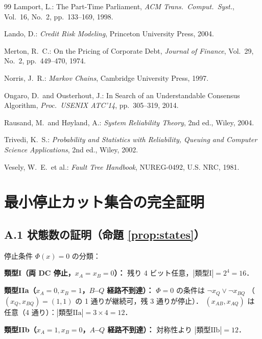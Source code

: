 \documentclass[12pt,a4paper]{article}
\theoremstyle{plain}
\theoremstyle{definition}
\theoremstyle{remark}
\begin{document}
\begin{thebibliography}{99}
  Lamport, L.:
  The Part-Time Parliament,
  \textit{ACM Trans.\ Comput.\ Syst.}, Vol.~16, No.~2, pp.~133--169, 1998.

  Lando, D.:
  \textit{Credit Risk Modeling}, Princeton University Press, 2004.

  Merton, R.~C.:
  On the Pricing of Corporate Debt,
  \textit{Journal of Finance}, Vol.~29, No.~2, pp.~449--470, 1974.

  Norris, J.~R.: \textit{Markov Chains}, Cambridge University Press, 1997.

  Ongaro, D.\ and Ousterhout, J.:
  In Search of an Understandable Consensus Algorithm,
  \textit{Proc.\ USENIX ATC'14}, pp.~305--319, 2014.

  Rausand, M.\ and H{\o}yland, A.:
  \textit{System Reliability Theory}, 2nd ed., Wiley, 2004.

  Trivedi, K.~S.:
  \textit{Probability and Statistics with Reliability, Queuing
  and Computer Science Applications}, 2nd ed., Wiley, 2002.

  Vesely, W.~E.\ et al.:
  \textit{Fault Tree Handbook}, NUREG-0492, U.S. NRC, 1981.

\end{thebibliography}

\appendix

\section{最小停止カット集合の完全証明}\label{app:cutsets}

\subsection*{A.1 状態数の証明（命題 \ref{prop:states}）}

停止条件 $\Phi(x)=0$ の分類：

\noindent\textbf{類型I（両 DC 停止，$x_A=x_B=0$）：}
残り 4 ビット任意，$|\text{類型I}|=2^4=16$．

\noindent\textbf{類型IIa（$x_A=0,x_B=1$，$B$–$Q$ 経路不到達）：}
$\Phi=0$ の条件は $\lnot x_Q\lor\lnot x_{BQ}$
（$(x_Q,x_{BQ})=(1,1)$ の 1 通りが継続可，残 3 通りが停止）．
$(x_{AB},x_{AQ})$ は任意（4 通り）：$|\text{類型IIa}|=3\times4=12$．

\noindent\textbf{類型IIb（$x_A=1,x_B=0$，$A$–$Q$ 経路不到達）：}
対称性より $|\text{類型IIb}|=12$．
\end{document}
